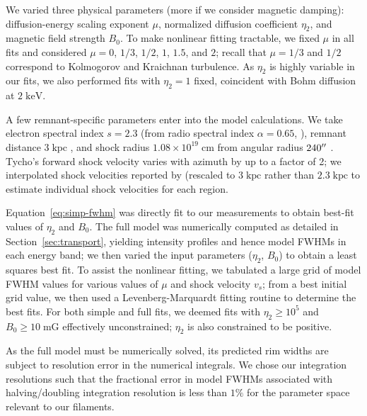 \documentclass[iop, apj, numberedappendix, twocolappendix]{emulateapj}
\newcommand*{\mt}{\mathrm}
\newcommand*{\unit}[1]{\;\mt{#1}}  %
\begin{document}
We varied three physical parameters (more if we consider magnetic damping):
diffusion-energy scaling exponent $\mu$, normalized diffusion
coefficient $\eta_2$, and magnetic field strength $B_0$.
To make nonlinear fitting tractable, we fixed $\mu$ in all fits and considered
$\mu = 0$, $1/3$, $1/2$, $1$, $1.5$, and $2$;
recall that $\mu = 1/3$ and $1/2$ correspond to Kolmogorov and Kraichnan turbulence.
As $\eta_2$ is highly variable in our fits, we also performed
fits with $\eta_2 = 1$ fixed, coincident with Bohm diffusion at $2 \unit{keV}$.

A few remnant-specific parameters enter into the model calculations.  We take
electron spectral index $s = 2.3$ (from radio spectral index $\alpha = 0.65$,
\citet{kothes2006} ),
remnant distance $3 \unit{kpc}$ \citep[cf.][]{hayato2010}, and
shock radius $1.08 \times 10^{19} \unit{cm}$ from angular radius $240\mbox{$^{\prime\prime}$}$
\citep{green2009}.  Tycho's forward shock velocity varies with azimuth by up to
a factor of 2; we interpolated shock velocities reported by
\citet{williams2013} (rescaled to $3 \unit{kpc}$ rather than $2.3 \unit{kpc}$
to estimate individual shock velocities for each region.

Equation~\eqref{eq:simp-fwhm} was directly fit to our measurements to obtain
best-fit values of $\eta_2$ and $B_0$.
The full model was numerically computed as detailed in
Section~\ref{sec:transport}, yielding intensity profiles and hence model FWHMs
in each energy band; we then varied the input parameters ($\eta_2$, $B_0$) to
obtain a least squares best fit.
To assist the nonlinear fitting, we tabulated a large grid of model FWHM values
for various values of $\mu$ and shock velocity $v_s$; from a best initial grid
value, we then used a Levenberg-Marquardt fitting routine to determine the best
fits.
For both simple and full fits, we deemed fits with $\eta_2 \geq 10^5$ and $B_0
\geq 10 \unit{mG}$ effectively unconstrained; $\eta_2$ is also constrained to
be positive.

As the full model must be numerically solved, its predicted rim widths are
subject to resolution error in the numerical integrals.  We chose our
integration resolutions such that the fractional error in model FWHMs
associated with halving/doubling integration resolution is less than $1\%$ for
the parameter space relevant to our filaments.
\end{document}
